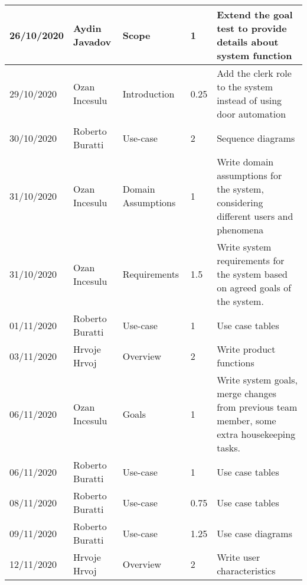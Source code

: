 \begin{table}[H]
\begin{tabular}{|p{2cm}|p{2.5cm}|p{2cm}|p{1.5cm}|p{8cm}|}
        26/10/2020 & Aydin Javadov   & Scope                & 1                & Extend the goal test to provide details about system function\\ \hline
        29/10/2020 & Ozan Incesulu   & Introduction         & 0.25             & Add the clerk role to the system instead of using door automation \\ \hline
        30/10/2020 & Roberto Buratti & Use-case             & 2                & Sequence diagrams \\ \hline
        31/10/2020 & Ozan Incesulu   & Domain Assumptions   & 1                & Write domain assumptions for the system, considering different users and phenomena \\ \hline
        31/10/2020 & Ozan Incesulu   & Requirements         & 1.5              & Write system requirements for the system based on agreed goals of the system. \\ \hline
        01/11/2020 & Roberto Buratti & Use-case             & 1                & Use case tables \\ \hline
        03/11/2020 & Hrvoje Hrvoj    & Overview             & 2                & Write product functions                                                                                                                                                                     \\ \hline
        06/11/2020 & Ozan Incesulu   & Goals                & 1                & Write system goals, merge changes from previous team member, some extra housekeeping tasks. \\ \hline
        06/11/2020 & Roberto Buratti & Use-case             & 1                & Use case tables \\ \hline
        08/11/2020 & Roberto Buratti & Use-case             & 0.75             & Use case tables \\ \hline
        09/11/2020 & Roberto Buratti & Use-case             & 1.25             & Use case diagrams \\ \hline
        12/11/2020 & Hrvoje Hrvoj    & Overview             & 2                & Write user characteristics                                                                                                                                                                  \\ \hline
    \end{tabular}
\end{table}
\newpage
